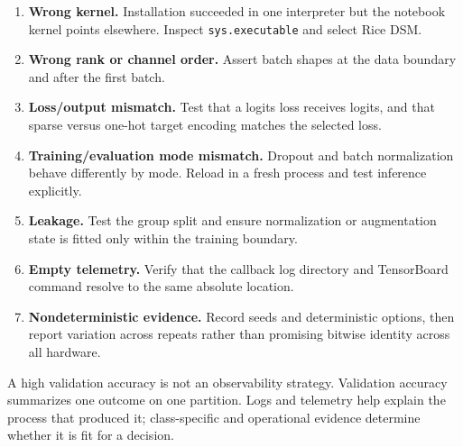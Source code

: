 \begin{enumerate}
  \item \textbf{Wrong kernel.} Installation succeeded in one interpreter but
  the notebook kernel points elsewhere. Inspect \texttt{sys.executable} and
  select Rice DSM.
  \item \textbf{Wrong rank or channel order.} Assert batch shapes at the data
  boundary and after the first batch.
  \item \textbf{Loss/output mismatch.} Test that a logits loss receives logits,
  and that sparse versus one-hot target encoding matches the selected loss.
  \item \textbf{Training/evaluation mode mismatch.} Dropout and batch
  normalization behave differently by mode. Reload in a fresh process and
  test inference explicitly.
  \item \textbf{Leakage.} Test the group split and ensure normalization or
  augmentation state is fitted only within the training boundary.
  \item \textbf{Empty telemetry.} Verify that the callback log directory and
  TensorBoard command resolve to the same absolute location.
  \item \textbf{Nondeterministic evidence.} Record seeds and deterministic
  options, then report variation across repeats rather than promising bitwise
  identity across all hardware.
\end{enumerate}

\begin{misconceptionbox}
A high validation accuracy is not an observability strategy. Validation
accuracy summarizes one outcome on one partition. Logs and telemetry help
explain the process that produced it; class-specific and operational evidence
determine whether it is fit for a decision.
\end{misconceptionbox}

